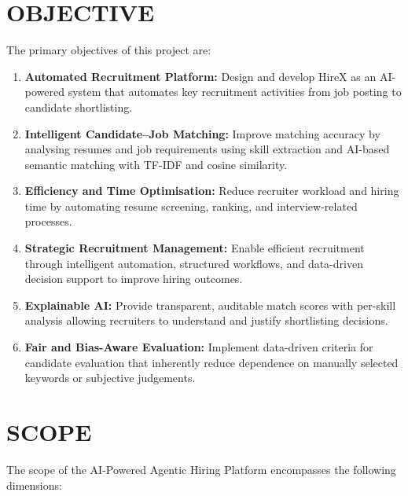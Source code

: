 \documentclass[12pt,a4paper]{report}
\begin{document}
\section{OBJECTIVE}

The primary objectives of this project are:
\begin{enumerate}[leftmargin=*, label=(\arabic*)]
    \item \textbf{Automated Recruitment Platform:} Design and develop HireX as an AI-powered system that automates key recruitment activities from job posting to candidate shortlisting.
    \item \textbf{Intelligent Candidate--Job Matching:} Improve matching accuracy by analysing resumes and job requirements using skill extraction and AI-based semantic matching with TF-IDF and cosine similarity.
    \item \textbf{Efficiency and Time Optimisation:} Reduce recruiter workload and hiring time by automating resume screening, ranking, and interview-related processes.
    \item \textbf{Strategic Recruitment Management:} Enable efficient recruitment through intelligent automation, structured workflows, and data-driven decision support to improve hiring outcomes.
    \item \textbf{Explainable AI:} Provide transparent, auditable match scores with per-skill analysis allowing recruiters to understand and justify shortlisting decisions.
    \item \textbf{Fair and Bias-Aware Evaluation:} Implement data-driven criteria for candidate evaluation that inherently reduce dependence on manually selected keywords or subjective judgements.
\end{enumerate}

\section{SCOPE}

The scope of the AI-Powered Agentic Hiring Platform encompasses the following dimensions:
\end{document}
